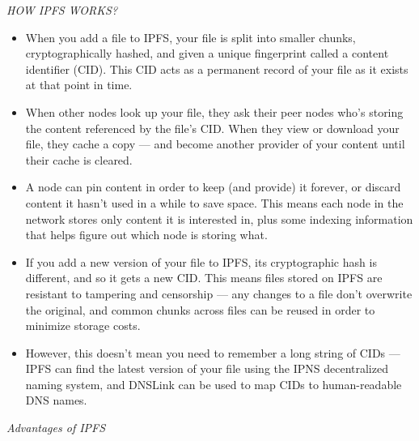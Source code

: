 \vspace{1cm}
\textit{HOW IPFS WORKS? }

\begin{itemize}
    \item 
    When you add a file to IPFS, your file is split into smaller chunks, cryptographically hashed, and given a unique fingerprint called a content identifier (CID). This CID acts as a permanent record of your file as it exists at that point in time.
    \item When other nodes look up your file, they ask their peer nodes who's storing the content referenced by the file's CID. When they view or download your file, they cache a copy — and become another provider of your content until their cache is cleared.
    \item A node can pin content in order to keep (and provide) it forever, or discard content it hasn't used in a while to save space. This means each node in the network stores only content it is interested in, plus some indexing information that helps figure out which node is storing what.
    \item If you add a new version of your file to IPFS, its cryptographic hash is different, and so it gets a new CID. This means files stored on IPFS are resistant to tampering and censorship — any changes to a file don't overwrite the original, and common chunks across files can be reused in order to minimize storage costs.
    \item However, this doesn't mean you need to remember a long string of CIDs — IPFS can find the latest version of your file using the IPNS decentralized naming system, and DNSLink can be used to map CIDs to human-readable DNS names.
\end{itemize}

\vspace{1cm}
\textit{Advantages of IPFS}

